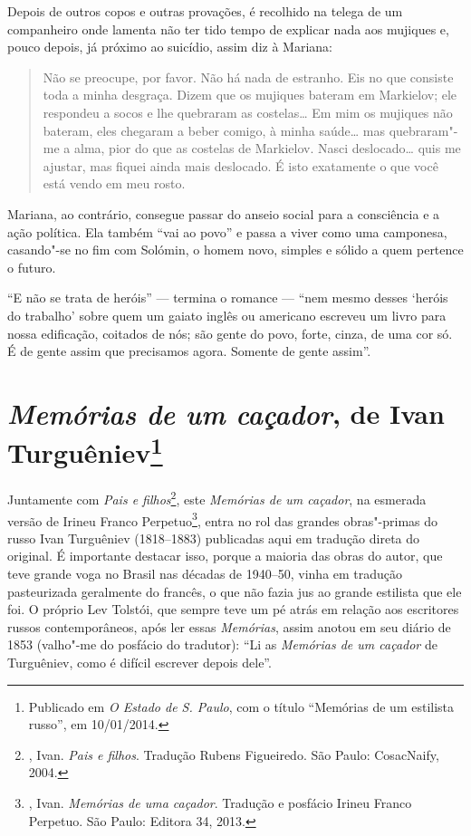 Depois de outros copos e outras provações, é recolhido na telega de um companheiro onde lamenta não ter tido tempo de explicar nada aos mujiques e, pouco depois, já próximo ao suicídio, assim diz à Mariana:

\begin{quote}
Não se preocupe, por favor. Não há nada de estranho. Eis no que consiste toda a minha desgraça. Dizem que os mujiques bateram em Markielov; ele respondeu a socos e lhe quebraram as costelas\ldots{} Em mim os mujiques não bateram, eles chegaram a beber comigo, à minha saúde\ldots{} mas quebraram"-me a alma, pior do que as costelas de Markielov. Nasci deslocado\ldots{} quis me
ajustar, mas fiquei ainda mais deslocado. É isto exatamente o que você está vendo em meu rosto.
\end{quote}

Mariana, ao contrário, consegue passar do anseio social para a consciência e a ação política. Ela também ``vai ao povo'' e passa a
viver como uma camponesa, casando"-se no fim com Solómin, o homem novo, simples e sólido a quem pertence o futuro.

``E não se trata de heróis'' --- termina o romance --- ``nem mesmo desses `heróis do trabalho' sobre quem um gaiato inglês ou americano escreveu um livro para nossa edificação, coitados de nós; são gente do povo, forte, cinza, de uma cor só. É de gente assim que precisamos agora. Somente de gente assim''.

\chapter{\emph{Memórias de um caçador}, de Ivan Turguêniev\footnote{Publicado em \emph{O Estado de S. Paulo}, com o título ``Memórias de um estilista russo'', em 10/01/2014.}}

Juntamente com \emph{Pais e filhos}\footnote{, Ivan. \emph{Pais e filhos}. Tradução Rubens Figueiredo. São Paulo: CosacNaify, 2004.}, este \emph{Memórias de um caçador}, na esmerada
versão de Irineu Franco Perpetuo\footnote{, Ivan. \emph{Memórias de uma caçador}. Tradução e posfácio Irineu Franco Perpetuo. São Paulo: Editora 34, 2013.}, entra no rol das grandes
obras"-primas do russo Ivan Turguêniev (1818--1883) publicadas aqui em tradução direta do original. É importante destacar isso, porque a
maioria das obras do autor, que teve grande voga no Brasil nas décadas de 1940--50, vinha em tradução pasteurizada geralmente do francês, o que não fazia jus ao grande estilista que ele foi. O próprio Lev Tolstói,
que sempre teve um pé atrás em relação aos escritores russos contemporâneos, após ler essas \emph{Memórias}, assim anotou em seu
diário de 1853 (valho"-me do posfácio do tradutor): ``Li as \emph{Memórias de um caçador} de Turguêniev, como é difícil escrever depois dele''.

